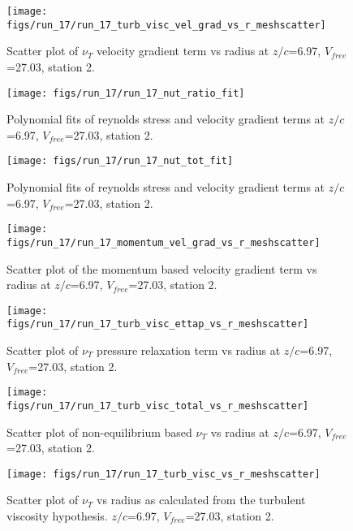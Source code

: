 \begin{figure}[H]
\centering
\texttt{[image: figs/run\_17/run\_17\_turb\_visc\_vel\_grad\_vs\_r\_meshscatter]}
\caption{Scatter plot of $\nu_T$ velocity gradient term vs radius at $z/c$=6.97, $V_{free}$=27.03, station 2.}
\end{figure}


\begin{figure}[H]
\centering
\texttt{[image: figs/run\_17/run\_17\_nut\_ratio\_fit]}
\caption{Polynomial fits of reynolds stress and velocity gradient terms at $z/c$=6.97, $V_{free}$=27.03, station 2.}
\end{figure}


\begin{figure}[H]
\centering
\texttt{[image: figs/run\_17/run\_17\_nut\_tot\_fit]}
\caption{Polynomial fits of reynolds stress and velocity gradient terms at $z/c$=6.97, $V_{free}$=27.03, station 2.}
\end{figure}


\begin{figure}[H]
\centering
\texttt{[image: figs/run\_17/run\_17\_momentum\_vel\_grad\_vs\_r\_meshscatter]}
\caption{Scatter plot of the momentum based velocity gradient term vs radius at $z/c$=6.97, $V_{free}$=27.03, station 2.}
\end{figure}


\begin{figure}[H]
\centering
\texttt{[image: figs/run\_17/run\_17\_turb\_visc\_ettap\_vs\_r\_meshscatter]}
\caption{Scatter plot of $\nu_T$ pressure relaxation term vs radius at $z/c$=6.97, $V_{free}$=27.03, station 2.}
\end{figure}


\begin{figure}[H]
\centering
\texttt{[image: figs/run\_17/run\_17\_turb\_visc\_total\_vs\_r\_meshscatter]}
\caption{Scatter plot of non-equilibrium based $\nu_T$ vs radius at $z/c$=6.97, $V_{free}$=27.03, station 2.}
\end{figure}


\begin{figure}[H]
\centering
\texttt{[image: figs/run\_17/run\_17\_turb\_visc\_vs\_r\_meshscatter]}
\caption{Scatter plot of $\nu_T$ vs radius as calculated from the turbulent viscosity hypothesis. $z/c$=6.97, $V_{free}$=27.03, station 2.}
\end{figure}


